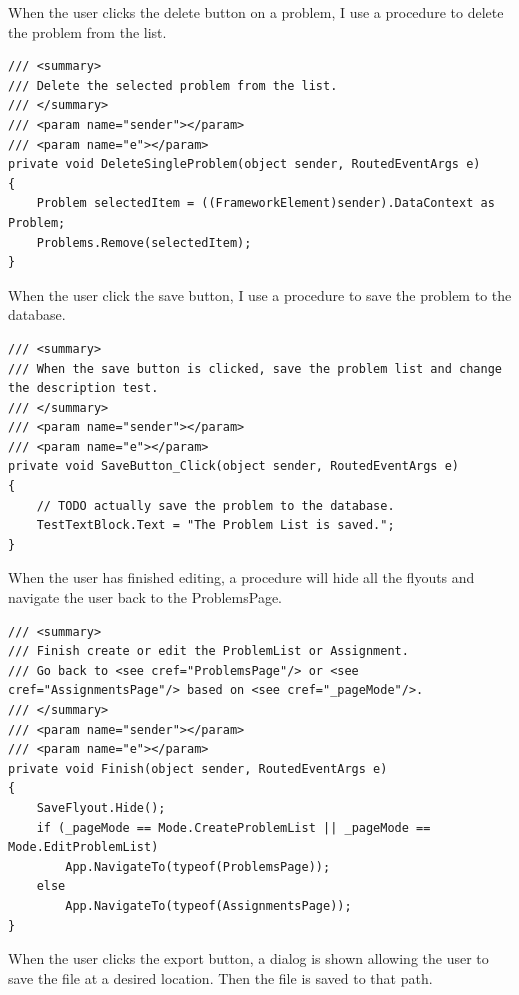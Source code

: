\documentclass[a4paper]{report}
\begin{document}
When the user clicks the delete button on a problem, I use a procedure to delete the problem from the list.

\begin{verbatim}
/// <summary>
/// Delete the selected problem from the list.
/// </summary>
/// <param name="sender"></param>
/// <param name="e"></param>
private void DeleteSingleProblem(object sender, RoutedEventArgs e)
{
    Problem selectedItem = ((FrameworkElement)sender).DataContext as Problem;
    Problems.Remove(selectedItem);
}
\end{verbatim}

When the user click the save button, I use a procedure to save the problem to the database.

\begin{verbatim}
/// <summary>
/// When the save button is clicked, save the problem list and change the description test.
/// </summary>
/// <param name="sender"></param>
/// <param name="e"></param>
private void SaveButton_Click(object sender, RoutedEventArgs e)
{
    // TODO actually save the problem to the database.
    TestTextBlock.Text = "The Problem List is saved.";
}
\end{verbatim}

When the user has finished editing, a procedure will hide all the flyouts and navigate the user back to the ProblemsPage.

\begin{verbatim}
/// <summary>
/// Finish create or edit the ProblemList or Assignment.
/// Go back to <see cref="ProblemsPage"/> or <see cref="AssignmentsPage"/> based on <see cref="_pageMode"/>.
/// </summary>
/// <param name="sender"></param>
/// <param name="e"></param>
private void Finish(object sender, RoutedEventArgs e)
{
    SaveFlyout.Hide();
    if (_pageMode == Mode.CreateProblemList || _pageMode == Mode.EditProblemList)
        App.NavigateTo(typeof(ProblemsPage));
    else
        App.NavigateTo(typeof(AssignmentsPage));
}
\end{verbatim}

When the user clicks the export button, a dialog is shown allowing the user to save the file at a desired location\cite{microsoft:docs:quickstart-using-file-and-folder-pickers}. Then the file is saved to that path.
\end{document}
